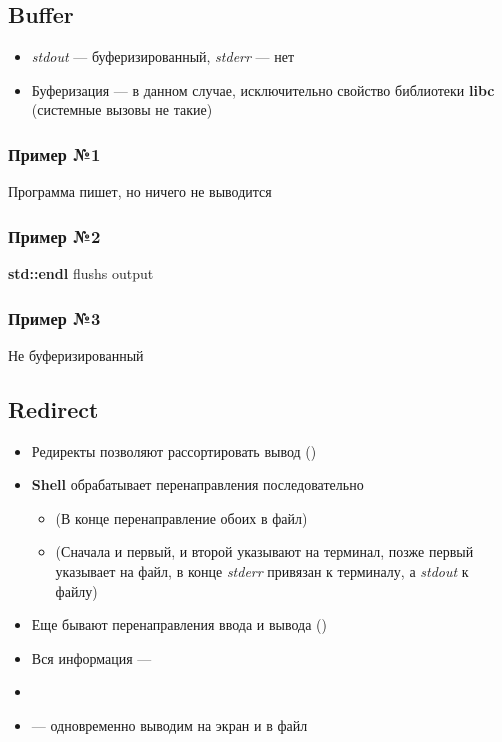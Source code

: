 \documentclass[../../lectures.tex]{subfiles}
\begin{document}
\subsection{Buffer}
\begin{itemize}
    \item \emph{stdout} --- буферизированный, \emph{stderr} --- нет
    \item Буферизация --- в данном случае, исключительно свойство библиотеки \textbf{libc} (системные вызовы не такие)
\end{itemize}

\subsubsection{Пример №1}
Программа пишет, но ничего не выводится

\subsubsection{Пример №2}
\textbf{std::endl} flushs output

\subsubsection{Пример №3}
Не буферизированный

\subsection{Redirect}
\begin{itemize}
    \item Редиректы позволяют рассортировать вывод ()
    \item \textbf{Shell} обрабатывает перенаправления последовательно
        \begin{itemize}
                \item {} (В конце перенаправление обоих в файл)
                \item {} (Сначала и первый, и второй указывают на терминал, позже первый указывает на файл, в конце \emph{stderr} привязан к терминалу, а \emph{stdout} к файлу)
        \end{itemize}
    \item Еще бывают перенаправления ввода и вывода ()
    \item Вся информация --- 
    \item {}
    \item {} --- одновременно выводим на экран и в файл
\end{itemize}
\end{document}
